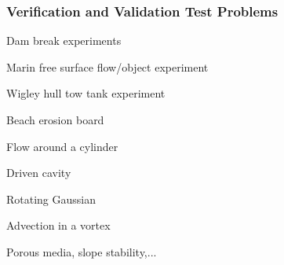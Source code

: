 \documentclass{beamer}
\begin{document}
\begin{frame}
  \frametitle{Verification and Validation Test Problems}
  \begin{minipage}{0.5\textwidth}
    \bit
  \item Dam break experiments
  \item Marin free surface flow/object experiment
  \item Wigley hull tow tank experiment
  \item Beach erosion board
  \item Flow around a cylinder
  \item Driven cavity
  \item Rotating Gaussian
  \item Advection in a vortex
  \item Porous media, slope stability,...
    \eit
  \end{minipage}\begin{minipage}{0.5\textwidth}
    \begin{overlayarea}{\textwidth}{\textwidth}
    \end{overlayarea}
  \end{minipage}
\end{frame}
\end{document}
